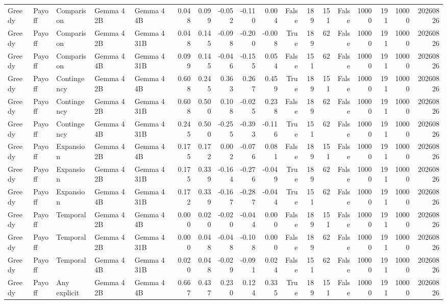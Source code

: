 \begin{tabular}{lllllrrrrrrrrrrrrr}
Greedy & Payoff & Comparison & Gemma 4 2B & Gemma 4 4B & 0.048 & 0.099 & -0.052 & -0.110 & 0.004 & False & 189 & 151 & False & 10000 & 191 & 10000 & 20260826 \\
Greedy & Payoff & Comparison & Gemma 4 2B & Gemma 4 31B & 0.048 & 0.145 & -0.098 & -0.200 & -0.008 & True & 189 & 62 & False & 10000 & 191 & 10000 & 20260826 \\
Greedy & Payoff & Comparison & Gemma 4 4B & Gemma 4 31B & 0.099 & 0.145 & -0.046 & -0.155 & 0.054 & False & 151 & 62 & False & 10000 & 191 & 10000 & 20260826 \\
Greedy & Payoff & Contingency & Gemma 4 2B & Gemma 4 4B & 0.608 & 0.245 & 0.363 & 0.267 & 0.459 & True & 189 & 151 & False & 10000 & 191 & 10000 & 20260826 \\
Greedy & Payoff & Contingency & Gemma 4 2B & Gemma 4 31B & 0.608 & 0.500 & 0.108 & -0.025 & 0.238 & False & 189 & 62 & False & 10000 & 191 & 10000 & 20260826 \\
Greedy & Payoff & Contingency & Gemma 4 4B & Gemma 4 31B & 0.245 & 0.500 & -0.255 & -0.393 & -0.116 & True & 151 & 62 & False & 10000 & 191 & 10000 & 20260826 \\
Greedy & Payoff & Expansion & Gemma 4 2B & Gemma 4 4B & 0.175 & 0.172 & 0.002 & -0.076 & 0.081 & False & 189 & 151 & False & 10000 & 191 & 10000 & 20260826 \\
Greedy & Payoff & Expansion & Gemma 4 2B & Gemma 4 31B & 0.175 & 0.339 & -0.164 & -0.276 & -0.049 & True & 189 & 62 & False & 10000 & 191 & 10000 & 20260826 \\
Greedy & Payoff & Expansion & Gemma 4 4B & Gemma 4 31B & 0.172 & 0.339 & -0.167 & -0.287 & -0.044 & True & 151 & 62 & False & 10000 & 191 & 10000 & 20260826 \\
Greedy & Payoff & Temporal & Gemma 4 2B & Gemma 4 4B & 0.000 & 0.020 & -0.020 & -0.044 & 0.000 & False & 189 & 151 & False & 10000 & 191 & 10000 & 20260826 \\
Greedy & Payoff & Temporal & Gemma 4 2B & Gemma 4 31B & 0.000 & 0.048 & -0.048 & -0.108 & 0.000 & False & 189 & 62 & False & 10000 & 191 & 10000 & 20260826 \\
Greedy & Payoff & Temporal & Gemma 4 4B & Gemma 4 31B & 0.020 & 0.048 & -0.029 & -0.091 & 0.024 & False & 151 & 62 & False & 10000 & 191 & 10000 & 20260826 \\
Greedy & Payoff & Any explicit & Gemma 4 2B & Gemma 4 4B & 0.667 & 0.437 & 0.230 & 0.124 & 0.335 & True & 189 & 151 & False & 10000 & 191 & 10000 & 20260826 \\

\end{tabular}

